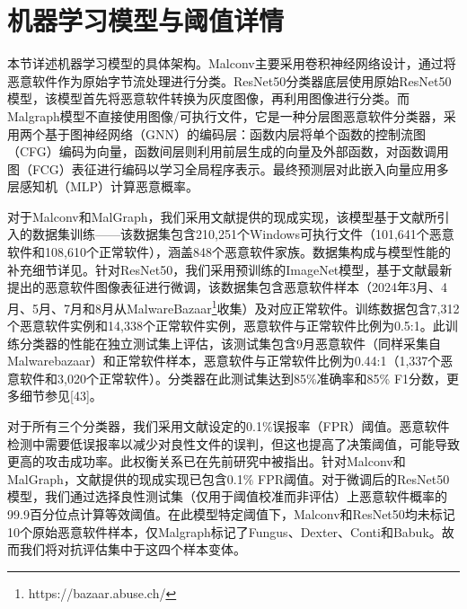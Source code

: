 \chapter{机器学习模型与阈值详情}

本节详述机器学习模型的具体架构。Malconv主要采用卷积神经网络设计，通过将恶意软件作为原始字节流处理进行分类。ResNet50分类器底层使用原始ResNet50模型\parencite{He2016}，该模型首先将恶意软件转换为灰度图像，再利用图像进行分类。而Malgraph模型不直接使用图像/可执行文件，它是一种分层图恶意软件分类器，采用两个基于图神经网络（GNN）的编码层：函数内层将单个函数的控制流图（CFG）编码为向量，函数间层则利用前层生成的向量及外部函数，对函数调用图（FCG）表征进行编码以学习全局程序表示。最终预测层对此嵌入向量应用多层感知机（MLP）计算恶意概率。

对于Malconv和MalGraph，我们采用文献\parencite{Ling2024}提供的现成实现，该模型基于文献\parencite{Ling2022}所引入的数据集训练——该数据集包含210,251个Windows可执行文件（101,641个恶意软件和108,610个正常软件），涵盖848个恶意软件家族。数据集构成与模型性能的补充细节详见\parencite{Ling2024}。针对ResNet50，我们采用预训练的ImageNet模型，基于文献\parencite{Li2025}最新提出的恶意软件图像表征进行微调，该数据集包含恶意软件样本（2024年3月、4月、5月、7月和8月从MalwareBazaar\footnote{https://bazaar.abuse.ch/}收集）及对应正常软件。训练数据包含7,312个恶意软件实例和14,338个正常软件实例，恶意软件与正常软件比例为0.5:1。此训练分类器的性能在独立测试集上评估，该测试集包含9月恶意软件（同样采集自Malwarebazaar）和正常软件样本，恶意软件与正常软件比例为0.44:1（1,337个恶意软件和3,020个正常软件）。分类器在此测试集达到85\%准确率和85\% F1分数，更多细节参见[43]。

对于所有三个分类器，我们采用文献\parencite{Ling2024}设定的0.1\%误报率（FPR）阈值。恶意软件检测中需要低误报率以减少对良性文件的误判，但这也提高了决策阈值，可能导致更高的攻击成功率。此权衡关系已在先前研究\parencite{Ling2024}中被指出。针对Malconv和MalGraph，文献\parencite{Ling2024}提供的现成实现已包含0.1\% FPR阈值。对于微调后的ResNet50模型，我们通过选择良性测试集（仅用于阈值校准而非评估）上恶意软件概率的99.9百分位点计算等效阈值。在此模型特定阈值下，Malconv和ResNet50均未标记10个原始恶意软件样本，仅Malgraph标记了Fungus、Dexter、Conti和Babuk。故而我们将对抗评估集中于这四个样本变体。